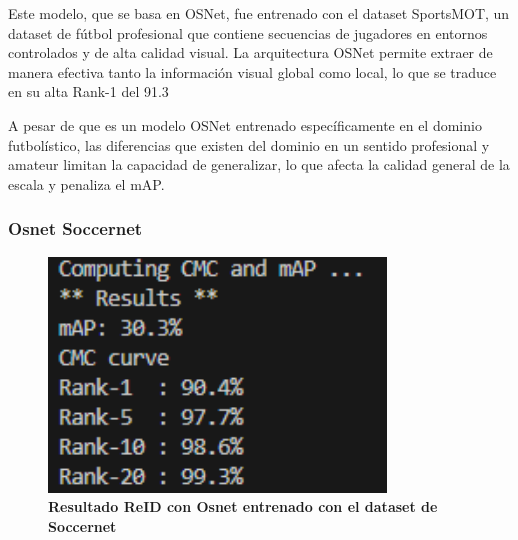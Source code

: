 \documentclass[12pt, a4paper, twoside]{article}
\begin{document}
 	Este modelo, que se basa en OSNet, fue entrenado con el dataset SportsMOT, un dataset de fútbol profesional que contiene secuencias de jugadores en entornos controlados y de alta calidad visual. La arquitectura OSNet permite extraer de manera efectiva tanto la información visual global como local, lo que se traduce en su alta Rank-1 del 91.3%
 	
 	A pesar de que es un modelo OSNet entrenado específicamente en el dominio futbolístico, las diferencias que existen del dominio en un sentido profesional y amateur limitan la capacidad de generalizar, lo que afecta la calidad general de la escala y penaliza el mAP.
 	

  	
 	\subsubsection{Osnet Soccernet}
 	\begin{figure}[H]
 		\centering
 		\includegraphics[width=0.8\textwidth]{image/model.osnet.pth.tar-10_soccernet}
 		\caption{\textbf{Resultado ReID con Osnet entrenado con el dataset de Soccernet}}
 		\label{fig:Resultado DeepEIoU con Osnet reid soccernet osnet_x1_0}
 	\end{figure}
 	
\end{document}
